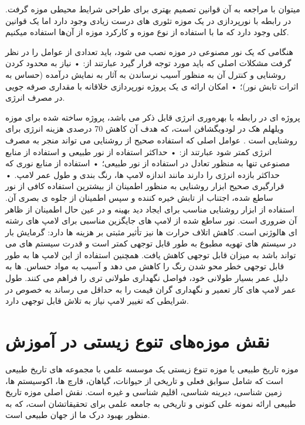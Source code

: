 میتوان با مراجعه به آن قوانین تصمیم بهتری برای طراحی شرایط محیطی موزه گرفت.
در رابطه با نورپردازی در یک موزه تئوری های درست زیادی وجود دارد اما یک قوانین کلی وجود دارد که ما با استفاده از نوع موزه‌ و کارکرد موزه از آن‌ها استفاده میکنیم.


هنگامی که یک نور مصنوعی در موزه نصب می شود، باید تعدادی از عوامل را در نظر گرفت  مشکلات اصلی که باید مورد توجه قرار گیرد عبارتند از:
 • نیاز به محدود کردن روشنایی و کنترل آن به منظور آسیب نرساندن به آثار به نمایش درآمده (حساس به اثرات تابش نور)؛
• امکان ارائه ی یک پروژه نورپردازی خلاقانه با مقداری صرفه جویی در مصرف انرژی.

پروژه ای در رابطه با بهره‌وری انرژی قابل ذکر می باشد، پروژه ساخته شده 
 برای موزه ویلهلم هک در لودویگشافن است، که هدف آن کاهش 70 درصدی هزینه انرژی برای روشنایی‌ است .
عوامل اصلی که استفاده صحیح از روشنایی می تواند منجر به مصرف انرژی کمتر شود عبارتند از:
 • حداکثر استفاده از نور طبیعی و استفاده از منابع مصنوعی تنها به منظور تعادل در استفاده از نور طبیعی؛ 
• استفاده از منابع نوری که حداکثر بازده انرژی را دارند مانند اندازه لامپ ها، رنگ بندی و طول عمر لامپ. 
• قرارگیری صحیح ابزار روشنایی به منظور اطمینان از بیشترین استفاده کافی از نور ساطع شده، اجتناب از تابش خیره کننده و سپس اطمینان از جلوه ی بصری آن.
استفاده از ابزار روشنایی مناسب برای ایجاد دید بهینه و در عین حال اطمینان از ظاهر آن ضروری است. نور ساطع شده از لامپ های  جایگزین مناسبی برای لامپ های رشته ای هالوژنی است. کاهش اتلاف حرارت  ها نیز تأثیر مثبتی بر هزینه ها دارد: گرمایش بار در سیستم های تهویه مطبوع به طور قابل توجهی کمتر است و قدرت سیستم های  می تواند باشد به میزان قابل توجهی کاهش یافت. همچنین استفاده از این لامپ ها به طور قابل توجهی خطر محو شدن رنگ را کاهش می دهد و آسیب به مواد حساس.  ها به دلیل عمر بسیار طولانی خود، فواصل نگهداری طولانی تری را فراهم می کنند. طول عمر لامپ های  کار تعمیر و نگهداری گران قیمت را به حداقل می رساند  به خصوص در شرایطی که تغییر لامپ نیاز به تلاش قابل توجهی دارد.


\section*{نقش موزه‌‌های تنوع زیستی در آموزش}
موزه تاریخ طبیعی یا موزه تنوع زیستی یک موسسه علمی با مجموعه های تاریخ طبیعی است که شامل سوابق فعلی و تاریخی از حیوانات، گیاهان، قارچ ها، اکوسیستم ها، زمین شناسی، دیرینه شناسی، اقلیم شناسی و غیره است.
نقش اصلی موزه تاریخ طبیعی ارائه نمونه علی کنونی و تاریخی به جامعه علمی برای تحقیقاتشان است، که به منظور بهبود درک ما از جهان طبیعی است.


